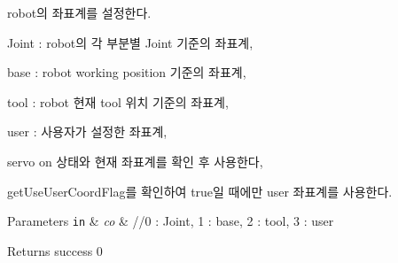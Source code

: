 robot의 좌표계를 설정한다. \par
 Joint \-: robot의 각 부분별 Joint 기준의 좌표계, \par
 base \-: robot working position 기준의 좌표계, \par
 tool \-: robot 현재 tool 위치 기준의 좌표계, \par
 user \-: 사용자가 설정한 좌표계, \par
 servo on 상태와 현재 좌표계를 확인 후 사용한다, \par
 get\-Use\-User\-Coord\-Flag를 확인하여 true일 때에만 user 좌표계를 사용한다. 
\begin{DoxyParams}[1]{Parameters}
\mbox{\tt in}  & {\em co} & //0 \-: Joint, 1 \-: base, 2 \-: tool, 3 \-: user \\
\hline
\end{DoxyParams}
\begin{DoxyReturn}{Returns}
success 0
\end{DoxyReturn}

